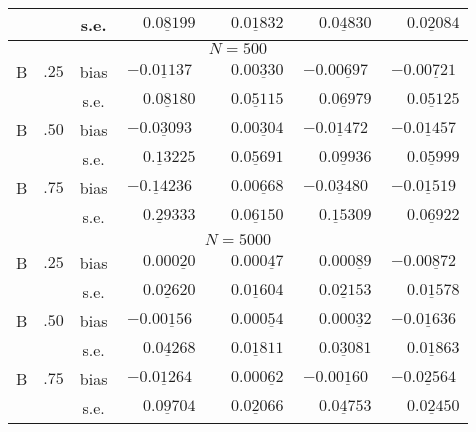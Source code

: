 \begin{tabular}{@{}ccc*{4}{c}@{}}
& & s.e. & $\phantom{-}0.0\underline{8}199$ & $\phantom{-}0.0\underline{1}832$ & $\phantom{-}0.0\underline{4}830$ & $\phantom{-}0.0\underline{2}084$ \\
\midrule
\multicolumn{7}{c}{$N = 500$} \\
\midrule
B & $.25$ & bias & $-0.0\underline{1}137$ & $\phantom{-}0.00\underline{3}30$ & $-0.00\underline{6}97$ & $-0.00\underline{7}21$ \\
& & s.e. & $\phantom{-}0.0\underline{8}180$ & $\phantom{-}0.0\underline{5}115$ & $\phantom{-}0.0\underline{6}979$ & $\phantom{-}0.0\underline{5}125$ \\
B & $.50$ & bias & $-0.0\underline{3}093$ & $\phantom{-}0.00\underline{3}04$ & $-0.0\underline{1}472$ & $-0.0\underline{1}457$ \\
& & s.e. & $\phantom{-}0.\underline{1}3225$ & $\phantom{-}0.0\underline{5}691$ & $\phantom{-}0.0\underline{9}936$ & $\phantom{-}0.0\underline{5}999$ \\
B & $.75$ & bias & $-0.\underline{1}4236$ & $\phantom{-}0.00\underline{6}68$ & $-0.0\underline{3}480$ & $-0.0\underline{1}519$ \\
& & s.e. & $\phantom{-}0.\underline{2}9333$ & $\phantom{-}0.0\underline{6}150$ & $\phantom{-}0.\underline{1}5309$ & $\phantom{-}0.0\underline{6}922$ \\
\midrule
\multicolumn{7}{c}{$N = 5000$} \\
\midrule
B & $.25$ & bias & $\phantom{-}0.000\underline{2}0$ & $\phantom{-}0.000\underline{4}7$ & $\phantom{-}0.000\underline{8}9$ & $-0.00\underline{8}72$ \\
& & s.e. & $\phantom{-}0.0\underline{2}620$ & $\phantom{-}0.0\underline{1}604$ & $\phantom{-}0.0\underline{2}153$ & $\phantom{-}0.0\underline{1}578$ \\
B & $.50$ & bias & $-0.00\underline{1}56$ & $\phantom{-}0.000\underline{5}4$ & $\phantom{-}0.000\underline{3}2$ & $-0.0\underline{1}636$ \\
& & s.e. & $\phantom{-}0.0\underline{4}268$ & $\phantom{-}0.0\underline{1}811$ & $\phantom{-}0.0\underline{3}081$ & $\phantom{-}0.0\underline{1}863$ \\
B & $.75$ & bias & $-0.0\underline{1}264$ & $\phantom{-}0.000\underline{6}2$ & $-0.00\underline{1}60$ & $-0.0\underline{2}564$ \\
& & s.e. & $\phantom{-}0.0\underline{9}704$ & $\phantom{-}0.0\underline{2}066$ & $\phantom{-}0.0\underline{4}753$ & $\phantom{-}0.0\underline{2}450$ \\
\bottomrule
\end{tabular}